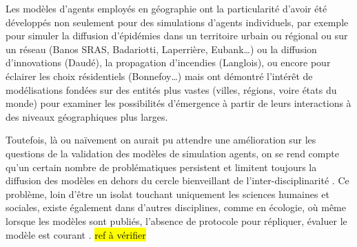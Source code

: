 
Les modèles d’agents employés en géographie ont la particularité d’avoir été développés non seulement pour des simulations d’agents individuels, par exemple pour simuler la diffusion d’épidémies dans un territoire urbain ou régional ou sur un réseau (Banos SRAS, Badariotti, Laperrière, Eubank…) ou la diffusion d’innovations (Daudé), la propagation d’incendies (Langlois), ou encore pour éclairer les choix résidentiels (Bonnefoy…) mais ont démontré l’intérêt de modélisations fondées sur des entités plus vastes (villes, régions, voire états du monde) pour examiner les possibilités d’émergence à partir de leurs interactions à des niveaux géographiques plus larges. 


Toutefois, là ou naïvement on aurait pu attendre une amélioration sur les questions de la validation des modèles de simulation agents, on se rend compte qu'un certain nombre de problématiques persistent et limitent toujours la diffusion des modèles en dehors du cercle bienveillant de l'inter-disciplinarité \autocite{Richiardi2006}. Ce problème, loin d'être un isolat touchant uniquement les sciences humaines et sociales, existe également dans d'autres disciplines, comme en écologie, où même lorsque les modèles sont publiés, l'absence de protocole pour répliquer, évaluer le modèle est courant \autocite{Grimm1999}. \hl {ref à vérifier}


